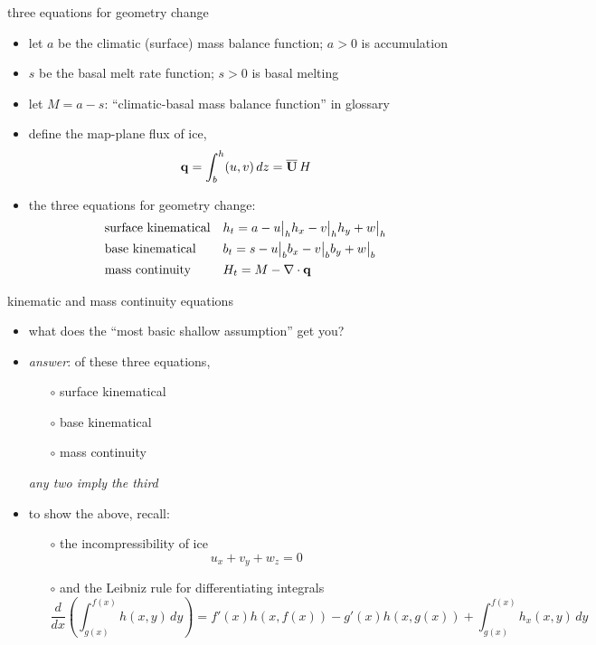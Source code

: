 \begin{frame}{three equations for geometry change}

\begin{itemize}
\item let $a$ be the climatic (surface) mass balance function;  $a>0$ is accumulation
\item $s$ be the basal melt rate function;  $s>0$ is basal melting
\item let $M=a-s$: ``climatic-basal mass balance function'' in glossary
\item define the map-plane flux of ice,
	$$\mathbf{q} = \int_{b}^{h} (u,v)\,dz = \overline{\mathbf{U}}\,H$$
\item the three equations for geometry change:
\begin{align*}
&\text{surface kinematical} && h_t = a - u\big|_h h_x - v\big|_h h_y + w\big|_h  \\
&\text{base kinematical} && b_t = s - u\big|_b b_x - v\big|_b b_y + w\big|_b  \\
&\text{mass continuity} && H_t = M - \nabla\cdot \mathbf{q} \\
\end{align*}
\end{itemize}
\end{frame}


\begin{frame}{kinematic and mass continuity equations}

\begin{itemize}
\item what does the ``most basic shallow assumption'' get you?
\item \emph{answer}: of these three equations,
  \begin{itemize}
  \item[$\circ$]  surface kinematical
  \item[$\circ$]  base kinematical
  \item[$\circ$]  mass continuity
  \end{itemize}
\emph{any two imply the third}

\bigskip
\item to show the above, recall:
  \begin{itemize}
  \item[$\circ$]  the incompressibility of ice
    $$u_x + v_y + w_z = 0$$
  \item[$\circ$]  and the Leibniz rule for differentiating integrals
  \scriptsize
    $$\frac{d}{dx}\left(\int_{g(x)}^{f(x)} h(x,y)\,dy\right) = f'(x) h(x,f(x)) - g'(x) h(x,g(x)) + \int_{g(x)}^{f(x)} h_x(x,y)\,dy$$
  \end{itemize}
\end{itemize}
\end{frame}


